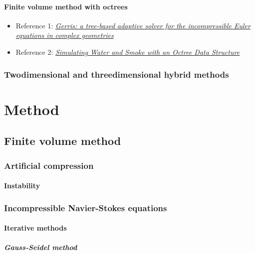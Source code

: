 \documentclass[]{report}
\begin{document}
\subsection{Finite volume method with octrees}

\begin{itemize}
    \item Reference 1: \textit{\href{http://gfs.sourceforge.net/gerris.pdf}{Gerris: a tree-based adaptive solver for the incompressible Euler equations in complex geometries}}
    \item Reference 2: \textit{\href{http://physbam.stanford.edu/~fedkiw/papers/stanford2004-02.pdf}{Simulating Water and Smoke with an Octree Data Structure}}
\end{itemize}

\section{Twodimensional and threedimensional hybrid methods}


\part{Method}

\chapter{Finite volume method}

\section{Artificial compression}

\subsection{Instability}

\section{Incompressible Navier-Stokes equations}

\subsection{Iterative methods}

\subsubsection{Gauss-Seidel method}
\end{document}
